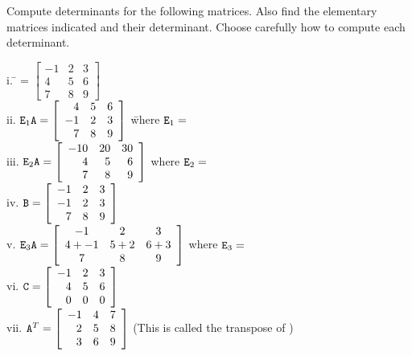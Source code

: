 \begin{myexb}[\bd{b}]
	Compute determinants for the following matrices. Also find the elementary matrices indicated and their determinant. Choose carefully how to compute each determinant.
	\begin{tabbing}
		\indent i. \quad \=  = $\left[ \begin{array}{rrr}-1&2&3\\4&5&6\\7&8&9 \end{array} \right]$  \\
		\indent ii. \> $\texttt{E}_1\texttt{A} = \left[ \begin{array}{rrr}4&5&6\\-1&2&3\\7&8&9 \end{array} \right]$ \hspace{1 in}\= where $\texttt{E}_1 =$ \\
		\indent iii. \> $\texttt{E}_2\texttt{A} = \left[ \begin{array}{rrr}-10&20&30\\4&5&6\\7&8&9 \end{array} \right]$ \> where $\texttt{E}_2 =$\\
		\indent iv. \> $\texttt{B} = \left[ \begin{array}{rrr}-1&2&3\\-1&2&3\\7&8&9 \end{array} \right]$ \\
		\indent v. \> $\texttt{E}_3\texttt{A} = \left[ \begin{array}{ccc}-1&2&3\\4+-1&5+2&6+3\\7&8&9 \end{array} \right]$ \> where $\texttt{E}_3 =$\\
		\indent vi. \> $\texttt{C} = \left[ \begin{array}{rrr}-1&2&3\\4&5&6\\0&0&0 \end{array} \right]$\\
		\indent vii. \> $\texttt{A}^T = \left[ \begin{array}{rrr}-1&4&7\\2&5&8\\3&6&9 \end{array} \right]$ \quad (This is called the transpose of )
	\end{tabbing}
\end{myexb}

